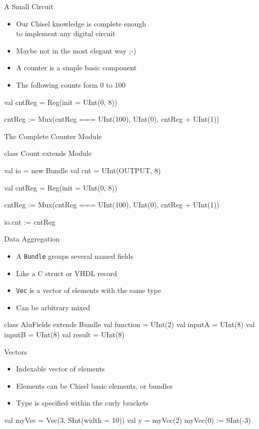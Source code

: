 \documentclass[xcolor=pdflatex,dvipsnames,table]{beamer}
\newcommand{\code}[1]{{\texttt{#1}}}
\begin{document}
\begin{frame}[fragile]{A Small Circuit}
\begin{itemize}
\item Our Chisel knowledge is complete enough\\ to implement any digital circuit
\item Maybe not in the most elegant way ;-)
\item A counter is a simple basic component
\item The following counts form 0 to 100
\end{itemize}
\begin{chisel}
  val cntReg = Reg(init = UInt(0, 8))

  cntReg := Mux(cntReg === UInt(100),
    UInt(0), cntReg + UInt(1))
\end{chisel}
\end{frame}

\begin{frame}[fragile]{The Complete Counter Module}
\begin{chisel}
class Count extends Module {
  val io = new Bundle {
    val cnt = UInt(OUTPUT, 8)
  }

  val cntReg = Reg(init = UInt(0, 8))

  cntReg := Mux(cntReg === UInt(100),
    UInt(0), cntReg + UInt(1))

  io.cnt := cntReg
}
\end{chisel}
\end{frame}

\begin{frame}[fragile]{Data Aggregation}
\begin{itemize}
\item A \code{Bundle} groups several named fields
\item Like a C struct or VHDL record
\item \code{Vec} is a vector of elements with the same type
\item Can be arbitrary mixed
\end{itemize}
\begin{chisel}
class AluFields extends Bundle {
  val function = UInt(2)
  val inputA = UInt(8)
  val inputB = UInt(8)
  val result = UInt(8)
}
\end{chisel}
\end{frame}

\begin{frame}[fragile]{Vectors}
\begin{itemize}
\item Indexable vector of elements
\item Elements can be Chisel basic elements, or bundles
\item Type is specified within the curly brackets
\end{itemize}
\begin{chisel}
val myVec = Vec(3, SInt(width = 10))
val y = myVec(2)
myVec(0) := SInt(-3)
\end{chisel}
\end{frame}
\end{document}
